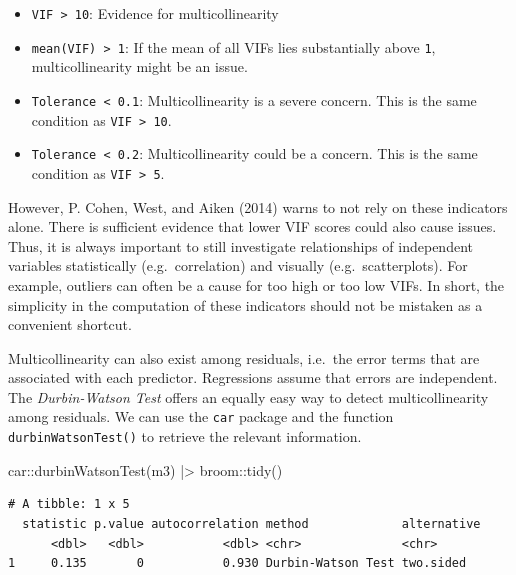 \documentclass[
  letterpaper,
]{krantz}
\makeatletter
\newenvironment{Shaded}{\begin{snugshade}}{\end{snugshade}}
\newcommand{\FunctionTok}[1]{\textcolor[rgb]{0.28,0.35,0.67}{#1}}
\newcommand{\NormalTok}[1]{\textcolor[rgb]{0.00,0.23,0.31}{#1}}
\newcommand{\SpecialCharTok}[1]{\textcolor[rgb]{0.37,0.37,0.37}{#1}}
\newenvironment{kframe}{%
\medskip{}
\setlength{\fboxsep}{.8em}
 \def\at@end@of@kframe{}%
 \ifinner\ifhmode%
  \def\at@end@of@kframe{\end{minipage}}%
  \begin{minipage}{\columnwidth}%
 \fi\fi%
 \def\FrameCommand##1{\hskip\@totalleftmargin \hskip-\fboxsep
 \colorbox{shadecolor}{##1}\hskip-\fboxsep
     \hskip-\linewidth \hskip-\@totalleftmargin \hskip\columnwidth}%
 \MakeFramed {\advance\hsize-\width
   \@totalleftmargin\z@ \linewidth\hsize
   \@setminipage}}%
 {\par\unskip\endMakeFramed%
 \at@end@of@kframe}
\renewenvironment{Shaded}{\begin{kframe}}{\end{kframe}}
\makeatother
\begin{document}
\begin{itemize}
\item
  \texttt{VIF\ \textgreater{}\ 10}: Evidence for multicollinearity
\item
  \texttt{mean(VIF)\ \textgreater{}\ 1}: If the mean of all VIFs lies
  substantially above \texttt{1}, multicollinearity might be an issue.
\item
  \texttt{Tolerance\ \textless{}\ 0.1}: Multicollinearity is a severe
  concern. This is the same condition as
  \texttt{VIF\ \textgreater{}\ 10}.
\item
  \texttt{Tolerance\ \textless{}\ 0.2}: Multicollinearity could be a
  concern. This is the same condition as
  \texttt{VIF\ \textgreater{}\ 5}.
\end{itemize}

However, P. Cohen, West, and Aiken (2014) warns to not rely on these
indicators alone. There is sufficient evidence that lower VIF scores
could also cause issues. Thus, it is always important to still
investigate relationships of independent variables statistically
(e.g.~correlation) and visually (e.g.~scatterplots). For example,
outliers can often be a cause for too high or too low VIFs. In short,
the simplicity in the computation of these indicators should not be
mistaken as a convenient shortcut.

Multicollinearity can also exist among residuals, i.e.~the error terms
that are associated with each predictor. Regressions assume that errors
are independent. The \emph{Durbin-Watson Test} offers an equally easy
way to detect multicollinearity among residuals. We can use the
\texttt{car} package and the function \texttt{durbinWatsonTest()} to
retrieve the relevant information.

\begin{Shaded}
\begin{Highlighting}[]
\NormalTok{car}\SpecialCharTok{::}\FunctionTok{durbinWatsonTest}\NormalTok{(m3) }\SpecialCharTok{|\textgreater{}}
\NormalTok{  broom}\SpecialCharTok{::}\FunctionTok{tidy}\NormalTok{()}
\end{Highlighting}
\end{Shaded}

\begin{verbatim}
# A tibble: 1 x 5
  statistic p.value autocorrelation method             alternative
      <dbl>   <dbl>           <dbl> <chr>              <chr>      
1     0.135       0           0.930 Durbin-Watson Test two.sided  
\end{verbatim}
\end{document}
